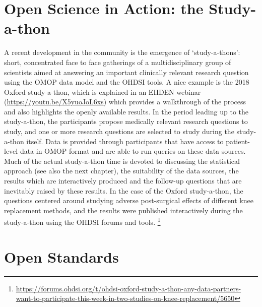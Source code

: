 \documentclass[11pt]{book}
\let\rmarkdownfootnote\footnote%
\def\footnote{\protect\rmarkdownfootnote}
\theoremstyle{definition}
\theoremstyle{definition}
\theoremstyle{definition}
\theoremstyle{remark}
\begin{document}
\hypertarget{open-science-in-action-the-study-a-thon}{%
\section{Open Science in Action: the Study-a-thon}\label{open-science-in-action-the-study-a-thon}}

A recent development in the community is the emergence of `study-a-thons': short, concentrated face to face gatherings of a multidisciplinary group of scientists aimed at answering an important clinically relevant research question using the OMOP data model and the OHDSI tools. A nice example is the 2018 Oxford study-a-thon, which is explained in an EHDEN webinar (\url{https://youtu.be/X5yuoJoL6xs}) which provides a walkthrough of the process and also highlights the openly available results. In the period leading up to the study-a-thon, the participants propose medically relevant research questions to study, and one or more research questions are selected to study during the study-a-thon itself. Data is provided through participants that have access to patient-level data in OMOP format and are able to run queries on these data sources. Much of the actual study-a-thon time is devoted to discussing the statistical approach (see also the next chapter), the suitability of the data sources, the results which are interactively produced and the follow-up questions that are inevitably raised by these results. In the case of the Oxford study-a-thon, the questions centered around studying adverse post-surgical effects of different knee replacement methods, and the results were published interactively during the study-a-thon using the OHDSI forums and tools. \footnote{\url{https://forums.ohdsi.org/t/ohdsi-oxford-study-a-thon-any-data-partners-want-to-participate-this-week-in-two-studies-on-knee-replacement/5650}}

\hypertarget{open-standards}{%
\section{Open Standards}\label{open-standards}}
\end{document}
